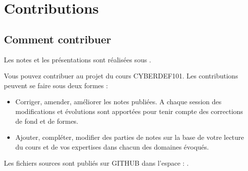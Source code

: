 
\section{Contributions}

\subsection{Comment contribuer}

Les notes et les présentations sont réalisées sous . 

Vous pouvez contribuer au projet du cours CYBERDEF101. Les contributions peuvent se faire sous deux formes :

\begin{itemize}
  \item Corriger, amender, améliorer les notes publiées. A chaque session des modifications et évolutions sont apportées pour tenir compte des corrections de fond et de formes. 
  \item Ajouter, compléter, modifier des parties de notes sur la base de votre lecture du cours et de vos expertises dans chacun des domaines évoqués.
\end{itemize}

 Les fichiers sources sont publiés sur GITHUB dans l'espace : .
 